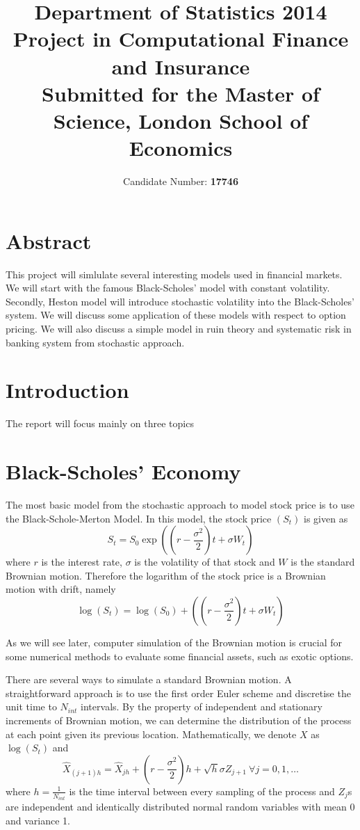 \documentclass[a4paper, 11pt]{article}
\begin{document}
\title{Department of Statistics 2014\\ {\bf Project in Computational Finance and Insurance}\\ {\small Submitted for the Master of Science, London School of Economics} }
\author{Candidate Number: \bf 17746}
\maketitle
\vfill
\section*{Abstract}
This project will simlulate several interesting models used in financial markets. We will start with the famous Black-Scholes' model with constant volatility. Secondly, Heston model will introduce stochastic volatility into the Black-Scholes' system. We will discuss some application of these models with respect to option pricing.
We will also discuss a simple model in ruin theory and systematic risk in banking system from stochastic approach.

\newpage

\section{Introduction}
The report will focus mainly on three topics 

\section{Black-Scholes' Economy}
The most basic model from the stochastic approach to model stock price is to use the Black-Schole-Merton Model. In this model, the stock price $(S_t)$ is given as
$$S_t = S_0 \exp\left( (r - \frac{\sigma^2}{2} )t + \sigma W_t \right)$$
where $r$ is the interest rate, $\sigma$ is the volatility of that stock and $W$ is the standard Brownian motion. Therefore the logarithm of the stock price is a Brownian motion with drift, namely 
$$\log(S_t) = \log(S_0) + ((r - \frac{\sigma^2}{2} )t + \sigma W_t )$$

As we will see later, computer simulation of the Brownian motion is crucial for some numerical methods to evaluate some financial assets, such as exotic options. 

There are several ways to simulate a standard Brownian motion. A straightforward approach is to use the first order Euler scheme and discretise the unit time to $N_{int}$ intervals. By the property of independent and stationary increments of Brownian motion, we can determine the distribution of the process at each point given its previous location. Mathematically, we denote $X$ as $\log(S_t)$ and
$$ \hat{X}_{(j+1)h} = \hat{X}_{jh} +( r-\frac{\sigma^2}{2})h +\sqrt{h} \sigma Z_{j+1}\  \forall j = 0, 1, \dots $$
where $h = \frac{1}{N_{int}}$ is the time interval between every sampling of the process and $Z_j$s are independent and identically distributed normal random variables with mean 0 and variance 1.
\end{document}
